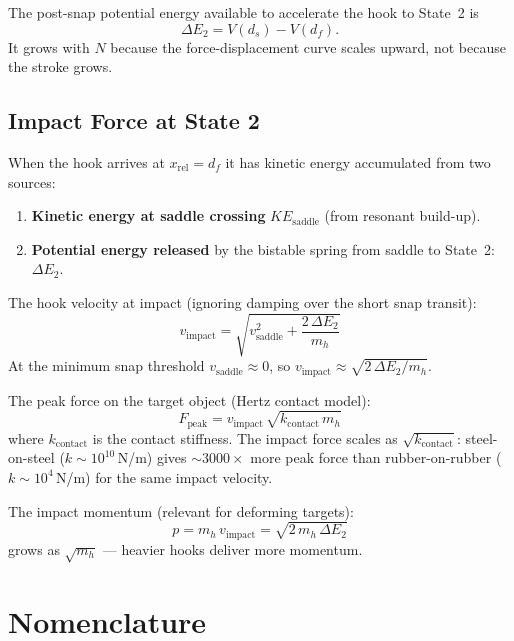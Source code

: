 \documentclass[11pt,letterpaper]{article}
\begin{document}
The post-snap potential energy available to accelerate the hook to State~2 is
\begin{equation}
  \Delta E_2 = V(d_s) - V(d_f).
\end{equation}
It grows with $N$ because the force-displacement curve scales upward, not
because the stroke grows.

\subsection{Impact Force at State 2}
\label{ssec:impact}

When the hook arrives at $x_{\mathrm{rel}} = d_f$ it has kinetic energy
accumulated from two sources:
\begin{enumerate}[nosep]
  \item \textbf{Kinetic energy at saddle crossing} $KE_{\mathrm{saddle}}$
    (from resonant build-up).
  \item \textbf{Potential energy released} by the bistable spring from saddle
    to State~2: $\Delta E_2$.
\end{enumerate}
The hook velocity at impact (ignoring damping over the short snap transit):
\begin{equation}
  v_{\mathrm{impact}} = \sqrt{v_{\mathrm{saddle}}^2 + \frac{2\,\Delta E_2}{m_h}}
  \label{eq:vimpact}
\end{equation}
At the minimum snap threshold $v_{\mathrm{saddle}} \approx 0$, so
$v_{\mathrm{impact}} \approx \sqrt{2\,\Delta E_2 / m_h}$.

The peak force on the target object (Hertz contact model):
\begin{equation}
  F_{\mathrm{peak}} = v_{\mathrm{impact}}\,\sqrt{k_{\mathrm{contact}}\,m_h}
  \label{eq:Fpeak}
\end{equation}
where $k_{\mathrm{contact}}$ is the contact stiffness.  The impact force
scales as $\sqrt{k_{\mathrm{contact}}}$: steel-on-steel
($k \sim 10^{10}$\,N/m) gives $\sim 3000\times$ more peak force than
rubber-on-rubber ($k \sim 10^{4}$\,N/m) for the same impact velocity.

The impact momentum (relevant for deforming targets):
\begin{equation}
  p = m_h\,v_{\mathrm{impact}} = \sqrt{2\,m_h\,\Delta E_2}
  \label{eq:pimpact}
\end{equation}
grows as $\sqrt{m_h}$ — heavier hooks deliver more momentum.

\section{Nomenclature}
\label{sec:nomenclature}
\end{document}
